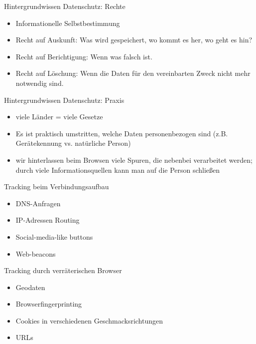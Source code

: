 \documentclass[utf8]{beamer}
\begin{document}
	\begin{frame}{Hintergrundwissen Datenschutz: Rechte}
		\begin{itemize}
			\item Informationelle Selbstbestimmung
			\item Recht auf Auskunft: Was wird gespeichert, wo kommt es her, wo geht es hin?
			\item Recht auf Berichtigung: Wenn was falsch ist.
			\item Recht auf Löschung: Wenn die Daten für den vereinbarten Zweck nicht mehr notwendig sind.
		\end{itemize}
	\end{frame}
	
	\begin{frame}{Hintergrundwissen Datenschutz: Praxis}
		\begin{itemize}
			\item viele Länder = viele Gesetze
			\item Es ist praktisch umstritten, welche Daten personenbezogen sind (z.B. Gerätekennung vs. natürliche Person)
			\item wir hinterlassen beim Browsen viele Spuren, die nebenbei verarbeitet werden; durch viele Informationsquellen kann man auf die Person schließen
		\end{itemize}
	\end{frame}
	
	\begin{frame}{Tracking beim Verbindungsaufbau}
		\begin{itemize}
			\item DNS-Anfragen
			\item IP-Adressen Routing
			\item Social-media-like buttons
			\item Web-beacons 
		\end{itemize}
	\end{frame}
	
	\begin{frame}{Tracking durch verräterischen Browser}
		\begin{itemize}
			\item Geodaten
			\item Browserfingerprinting
			\item Cookies in verschiedenen Geschmacksrichtungen
			\item URLs 
		\end{itemize}
	\end{frame}
	
\end{document}
